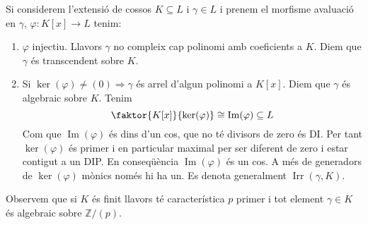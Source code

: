\documentclass[a4paper,11pt]{report}
\DeclareMathOperator{\irr}{Irr}
\newcommand{\im}{\Rightarrow}
\theoremstyle{theorem}
\theoremstyle{definition}
\DeclareMathOperator{\ima}{Im}
\begin{document}
Si considerem l'extensió de cossos $K\subseteq L$ i $\gamma\in L$ i prenem el morfisme avaluació en $\gamma$, $\varphi:K[x]\longrightarrow L$ tenim:
\begin{enumerate}
	\item $\varphi$ injectiu. Llavors $\gamma$ no compleix cap polinomi amb coeficients a $K$. Diem que $\gamma$ és transcendent sobre $K$.
\item Si $\ker(\varphi)\neq(0)\im\gamma$ és arrel d'algun polinomi a $K[x]$. Diem que $\gamma$ és algebraic sobre $K$. Tenim $$\faktor{K[x]}{\ker(\varphi)}\cong \ima(\varphi)\subseteq L$$ 
Com que $\ima(\varphi)$ és dins d'un cos, que no té divisors de zero és DI. Per tant $\ker(\varphi)$ és primer i en particular maximal per ser diferent de zero i estar contigut a un DIP. En conseqüència $\ima(\varphi)$ és un cos. A més de generadors de $\ker(\varphi)$ mònics només hi ha un.  Es denota generalment $\irr(\gamma,K)$.
\end{enumerate}

Observem que si $K$ és finit llavors té característica $p$ primer i tot element $\gamma\in K$ és algebraic sobre $\mathbb{Z}/(p)$.
\end{document}

